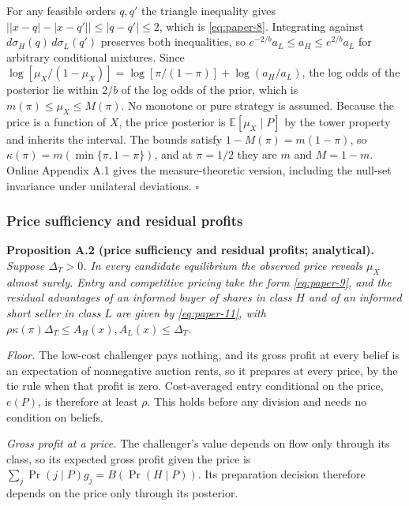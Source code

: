 For any feasible orders \(q,q'\) the triangle inequality gives
\(\big||x-q|-|x-q'|\big|\le|q-q'|\le2\), which is \eqref{eq:paper-8}.
Integrating against \(d\sigma_H(q)\,d\sigma_L(q')\) preserves both
inequalities, so \(e^{-2/b}a_L\le a_H\le e^{2/b}a_L\) for arbitrary
conditional mixtures. Since
\(\log[\mu_X/(1-\mu_X)]=\log[\pi/(1-\pi)]+\log(a_H/a_L)\), the log odds
of the posterior lie within \(2/b\) of the log odds of the prior, which
is \(m(\pi)\le\mu_X\le M(\pi)\). No monotone or pure strategy is
assumed. Because the price is a function of \(X\), the price posterior
is \(\mathbb E[\mu_X\mid P]\) by the tower property and inherits the
interval. The bounds satisfy \(1-M(\pi)=m(1-\pi)\), so
\(\kappa(\pi)=m(\min\{\pi,1-\pi\})\), and at \(\pi=1/2\) they are \(m\)
and \(M=1-m\). Online Appendix A.1 gives the measure-theoretic version,
including the null-set invariance under unilateral deviations.
\(\square\)


\subsubsection{Price sufficiency and residual
profits}\label{price-sufficiency-and-residual-profits}

\protect{}\label{result-proposition-a-2}{\textbf{Proposition
A.2 (price sufficiency and residual profits; analytical).}}
\emph{Suppose \(\Delta_T>0\). In every candidate equilibrium the
observed price reveals \(\mu_X\) almost surely. Entry and competitive
pricing take the form \eqref{eq:paper-9}, and the residual advantages
of an informed buyer of shares in class \(H\) and of an informed short
seller in class \(L\) are given by \eqref{eq:paper-11}, with
\(\rho\kappa(\pi)\Delta_T\le A_H(x),A_L(x)\le\Delta_T\).}

\emph{Floor.} The low-cost challenger pays nothing, and its gross profit
at every belief is an expectation of nonnegative auction rents, so it
prepares at every price, by the tie rule when that profit is zero.
Cost-averaged entry conditional on the price, \(e(P)\), is therefore at
least \(\rho\). This holds before any division and needs no condition on
beliefs.

\emph{Gross profit at a price.} The challenger's value depends on flow
only through its class, so its expected gross profit given the price is
\(\sum_j\Pr(j\mid P)g_j=B(\Pr(H\mid P))\). Its preparation decision
therefore depends on the price only through its posterior.

